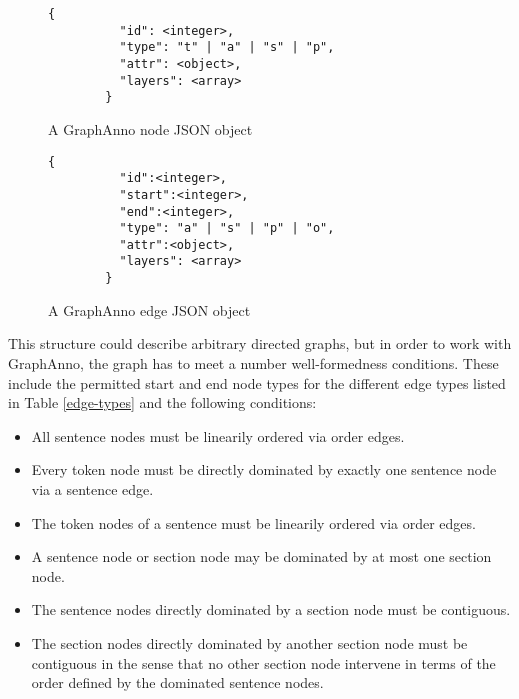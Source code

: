 \documentclass[12pt]{scrartcl}
\newenvironment{figurel}{\begin{figure}[htb]}{\end{figure}}
\begin{document}
\begin{figurel}
	\begin{lstlisting}[gobble=8]
		{
		  "id": <integer>,
		  "type": "t" | "a" | "s" | "p",
		  "attr": <object>,
		  "layers": <array>
		}
	\end{lstlisting}
	\caption{A GraphAnno node JSON object}
	\label{json-node}
\end{figurel}
\begin{figurel}
	\begin{lstlisting}[gobble=8]
		{
		  "id":<integer>,
		  "start":<integer>,
		  "end":<integer>,
		  "type": "a" | "s" | "p" | "o",
		  "attr":<object>,
		  "layers": <array>
		}
	\end{lstlisting}
	\caption{A GraphAnno edge JSON object}
	\label{json-edge}
\end{figurel}

This structure could describe arbitrary directed graphs, but in order to work with GraphAnno, the graph has to meet a number well-formedness conditions. These include the permitted start and end node types for the different edge types listed in Table \ref{edge-types} and the following conditions:

\begin{itemize}
	\item All sentence nodes must be linearily ordered via order edges.
	\item Every token node must be directly dominated by exactly one sentence node via a sentence edge.
	\item The token nodes of a sentence must be linearily ordered via order edges.
	\item A sentence node or section node may be dominated by at most one section node.
	\item The sentence nodes directly dominated by a section node must be contiguous.
	\item The section nodes directly dominated by another section node must be contiguous in the sense that no other section node intervene in terms of the order defined by the dominated sentence nodes.
\end{itemize}
\end{document}

